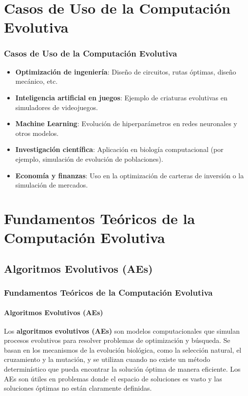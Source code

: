 \documentclass[
	11pt, %
]{beamer}
\begin{document}
\section{Casos de Uso de la Computación Evolutiva}
\begin{frame}
    \frametitle{Casos de Uso de la Computación Evolutiva}
    \begin{itemize}
        \item \textbf{Optimización de ingeniería}: Diseño de circuitos, rutas óptimas, diseño mecánico, etc.
        \item \textbf{Inteligencia artificial en juegos}: Ejemplo de criaturas evolutivas en simuladores de videojuegos.
        \item \textbf{Machine Learning}: Evolución de hiperparámetros en redes neuronales y otros modelos.
        \item \textbf{Investigación científica}: Aplicación en biología computacional (por ejemplo, simulación de evolución de poblaciones).
        \item \textbf{Economía y finanzas}: Uso en la optimización de carteras de inversión o la simulación de mercados.
    \end{itemize}
    
\end{frame}

\section{Fundamentos Teóricos de la Computación Evolutiva}
\subsection{Algoritmos Evolutivos (AEs)}
\begin{frame}
	\frametitle{Fundamentos Teóricos de la Computación Evolutiva}
	\framesubtitle{Algoritmos Evolutivos (AEs)}
        Los \textbf{algoritmos evolutivos (AEs)} son modelos computacionales que simulan procesos evolutivos para resolver problemas de optimización y búsqueda. Se basan en los mecanismos de la evolución biológica, como la selección natural, el cruzamiento y la mutación, y se utilizan cuando no existe un método determinístico que pueda encontrar la solución óptima de manera eficiente. Los AEs son útiles en problemas donde el espacio de soluciones es vasto y las soluciones óptimas no están claramente definidas.
\end{frame}
\end{document}
